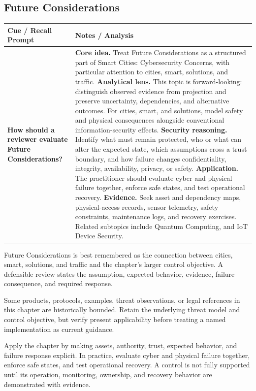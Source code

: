 \documentclass[11pt]{article}
\newcommand{\CornellHeader}{%
\rowcolor{Navy}\color{white}\bfseries Cue / Recall Prompt & \color{white}\bfseries Notes / Analysis\\\hline}
\newcommand{\CornellRow}[2]{%
\cellcolor{CueGray}\RaggedRight\textbf{#1} & \RaggedRight #2\\\hline}
\begin{document}
\subsection*{Future Considerations}
\begin{longtable}{>{\RaggedRight\arraybackslash}p{}|>{\RaggedRight\arraybackslash}p{}}
\CornellHeader
\CornellRow{How should a reviewer evaluate Future Considerations?}{\textbf{Core idea.} Treat Future Considerations as a structured part of Smart Cities: Cybersecurity Concerns, with particular attention to cities, smart, solutions, and traffic. \textbf{Analytical lens.} This topic is forward-looking: distinguish observed evidence from projection and preserve uncertainty, dependencies, and alternative outcomes. For cities, smart, and solutions, model safety and physical consequences alongside conventional information-security effects. \textbf{Security reasoning.} Identify what must remain protected, who or what can alter the expected state, which assumptions cross a trust boundary, and how failure changes confidentiality, integrity, availability, privacy, or safety. \textbf{Application.} The practitioner should evaluate cyber and physical failure together, enforce safe states, and test operational recovery. \textbf{Evidence.} Seek asset and dependency maps, physical-access records, sensor telemetry, safety constraints, maintenance logs, and recovery exercises. Related subtopics include Quantum Computing, and IoT Device Security.}
\end{longtable}
\begin{topicsummary}
Future Considerations is best remembered as the connection between cities, smart, solutions, and traffic and the chapter's larger control objective. A defensible review states the assumption, expected behavior, evidence, failure consequence, and required response.
\end{topicsummary}
\begin{historybox}
Some products, protocols, examples, threat observations, or legal references in this chapter are historically bounded. Retain the underlying threat model and control objective, but verify present applicability before treating a named implementation as current guidance.
\end{historybox}
\begin{defensebox}
Apply the chapter by making assets, authority, trust, expected behavior, and failure response explicit. In practice, evaluate cyber and physical failure together, enforce safe states, and test operational recovery. A control is not fully supported until its operation, monitoring, ownership, and recovery behavior are demonstrated with evidence.
\end{defensebox}
\end{document}
